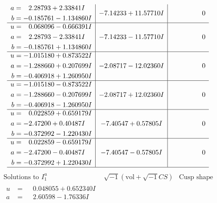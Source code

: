 \documentclass[1p]{elsarticle_modified}
\theoremstyle{definition}
\newcommand{\I}{\sqrt{-1}}
\begin{document}
$$\begin{array}{c|c|c}
\begin{aligned}
a &= \phantom{-}2.28793 + 2.33841 I \\
b &= -0.185761 - 1.134860 I\end{aligned}
 & -7.14233 + 11.57710 I & \phantom{-0.000000 } 0 \\ \hline\begin{aligned}
u &= \phantom{-}0.068096 - 0.666391 I \\
a &= \phantom{-}2.28793 - 2.33841 I \\
b &= -0.185761 + 1.134860 I\end{aligned}
 & -7.14233 - 11.57710 I & \phantom{-0.000000 } 0 \\ \hline\begin{aligned}
u &= -1.015180 + 0.873522 I \\
a &= -1.288660 + 0.207699 I \\
b &= -0.406918 + 1.260950 I\end{aligned}
 & -2.08717 - 12.02360 I & \phantom{-0.000000 } 0 \\ \hline\begin{aligned}
u &= -1.015180 - 0.873522 I \\
a &= -1.288660 - 0.207699 I \\
b &= -0.406918 - 1.260950 I\end{aligned}
 & -2.08717 + 12.02360 I & \phantom{-0.000000 } 0 \\ \hline\begin{aligned}
u &= \phantom{-}0.022859 + 0.659179 I \\
a &= -2.47200 + 0.40487 I \\
b &= -0.372992 - 1.220430 I\end{aligned}
 & -7.40547 + 0.57805 I & \phantom{-0.000000 } 0 \\ \hline\begin{aligned}
u &= \phantom{-}0.022859 - 0.659179 I \\
a &= -2.47200 - 0.40487 I \\
b &= -0.372992 + 1.220430 I\end{aligned}
 & -7.40547 - 0.57805 I & \phantom{-0.000000 } 0\\
 \hline 
 \end{array}$$\newpage$$\begin{array}{c|c|c}  
\text{Solutions to }I^u_{1}& \I (\text{vol} + \sqrt{-1}CS) & \text{Cusp shape}\\
 \hline 
\begin{aligned}
u &= \phantom{-}0.048055 + 0.652340 I \\
a &= \phantom{-}2.60598 - 1.76336 I \\

\end{aligned}
\end{array}$$
\end{document}
